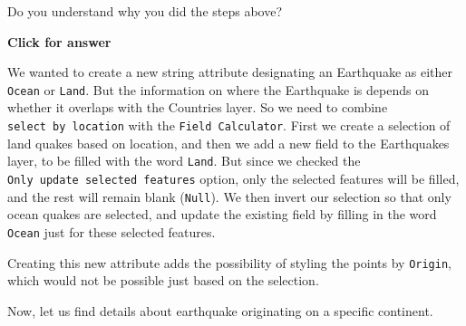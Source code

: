 \documentclass[
  letterpaper,
  DIV=11,
  numbers=noendperiod]{scrreprt}
\begin{document}
\begin{tcolorbox}[enhanced jigsaw, coltitle=black, toprule=.15mm, breakable, opacitybacktitle=0.6, left=2mm, colback=white, leftrule=.75mm, rightrule=.15mm, colbacktitle=quarto-callout-important-color!10!white, toptitle=1mm, titlerule=0mm, colframe=quarto-callout-important-color-frame, arc=.35mm, bottomtitle=1mm, opacityback=0, bottomrule=.15mm, title=\textcolor{quarto-callout-important-color}{\faExclamation}\hspace{0.5em}{Stop and Think}]

Do you understand why you did the steps above?

\end{tcolorbox}

\begin{tcolorbox}[enhanced jigsaw, toprule=.15mm, breakable, left=2mm, colframe=quarto-callout-important-color-frame, colback=white, arc=.35mm, leftrule=.75mm, opacityback=0, rightrule=.15mm, bottomrule=.15mm]

\vspace{-3mm}\textbf{Click for answer}\vspace{3mm}

We wanted to create a new string attribute designating an Earthquake as
either \texttt{Ocean} or \texttt{Land}. But the information on where the
Earthquake is depends on whether it overlaps with the Countries layer.
So we need to combine \texttt{select\ by\ location} with the
\texttt{Field\ Calculator}. First we create a selection of land quakes
based on location, and then we add a new field to the Earthquakes layer,
to be filled with the word \texttt{Land}. But since we checked the
\texttt{Only\ update\ selected\ features} option, only the selected
features will be filled, and the rest will remain blank (\texttt{Null}).
We then invert our selection so that only ocean quakes are selected, and
update the existing field by filling in the word \texttt{Ocean} just for
these selected features.

Creating this new attribute adds the possibility of styling the points
by \texttt{Origin}, which would not be possible just based on the
selection.

\end{tcolorbox}

Now, let us find details about earthquake originating on a specific
continent.
\end{document}
